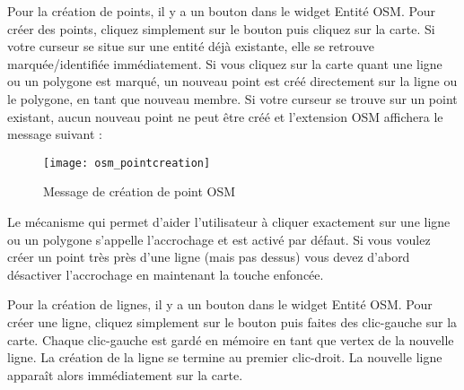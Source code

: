Pour la création de points, il y a un bouton  dans le widget Entité OSM. Pour créer des points, cliquez simplement sur le bouton puis cliquez sur la carte. Si votre curseur se situe sur une entité déjà existante, elle se retrouve marquée/identifiée immédiatement. Si vous cliquez sur la carte quant une ligne ou un polygone est marqué, un nouveau point est créé directement sur la ligne ou le polygone, en tant que nouveau membre. Si votre curseur se trouve sur un point existant, aucun nouveau point ne peut être créé et l'extension OSM affichera le message suivant :

\begin{figure}[ht]
\centering
   \texttt{[image: osm\_pointcreation]}
   \caption{Message de création de point OSM \nixcaption}\label{fig:osmpoicreat}
\end{figure}

Le mécanisme qui permet d'aider l'utilisateur à cliquer exactement sur une ligne ou un polygone s'appelle l'accrochage et est activé par défaut. Si vous voulez créer un point très près d'une ligne (mais pas dessus) vous devez d'abord désactiver l'accrochage en maintenant la touche  enfoncée.


Pour la création de lignes, il y a un bouton  dans le widget Entité OSM. Pour créer une ligne, cliquez simplement sur le bouton puis faites des clic-gauche sur la carte. Chaque clic-gauche est gardé en mémoire en tant que vertex de la nouvelle ligne. La création de la ligne se termine au premier clic-droit. La nouvelle ligne apparaît alors immédiatement sur la carte.

